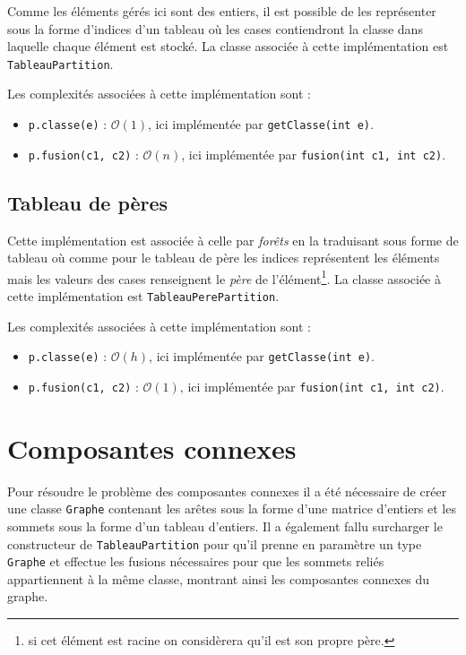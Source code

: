 \documentclass[12pt, a4paper]{report}
\begin{document}
{    Comme les éléments gérés ici sont des entiers, il est possible de les représenter sous la forme d'indices d'un tableau où les cases contiendront la classe dans laquelle chaque élément est stocké. La classe associée à cette implémentation est \texttt{TableauPartition}.

    Les complexités associées à cette implémentation sont :
    \begin{itemize}
        \item \texttt{p.classe(e)} : $\mathcal{O}(1)$, ici implémentée par \texttt{getClasse(int e)}.
        \item \texttt{p.fusion(c1, c2)} : $\mathcal{O}(n)$, ici implémentée par \texttt{fusion(int c1, int c2)}.
    \end{itemize}

    \subsection{Tableau de pères}

    Cette implémentation est associée à celle par \emph{forêts} en la traduisant sous forme de tableau où comme pour le tableau de père les indices représentent les éléments mais les valeurs des cases renseignent le \emph{père} de l'élément\footnote{si cet élément est racine on considèrera qu'il est son propre père.}. La classe associée à cette implémentation est \texttt{TableauPerePartition}.

    Les complexités associées à cette implémentation sont :
    \begin{itemize}
        \item \texttt{p.classe(e)} : $\mathcal{O}(h)$, ici implémentée par \texttt{getClasse(int e)}.
        \item \texttt{p.fusion(c1, c2)} : $\mathcal{O}(1)$, ici implémentée par \texttt{fusion(int c1, int c2)}.
    \end{itemize}

    \section{Composantes connexes}

    Pour résoudre le problème des composantes connexes il a été nécessaire de créer une classe \texttt{Graphe} contenant les arêtes sous la forme d'une matrice d'entiers et les sommets sous la forme d'un tableau d'entiers. Il a également fallu surcharger le constructeur de \texttt{TableauPartition} pour qu'il prenne en paramètre un type \texttt{Graphe} et effectue les fusions nécessaires pour que les sommets reliés appartiennent à la même classe, montrant ainsi les composantes connexes du graphe.

}
\end{document}
